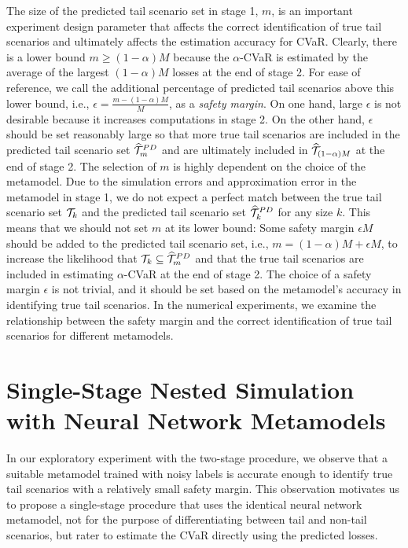 The size of the predicted tail scenario set in stage 1, $m$, is an important experiment design parameter that affects the correct identification of true tail scenarios and ultimately affects the estimation accuracy for CVaR.
Clearly, there is a lower bound $m \geq (1-\alpha)M$ because the $\alpha$-CVaR is estimated by the average of the largest $(1-\alpha)M$ losses at the end of stage 2.
For ease of reference, we call the additional percentage of predicted tail scenarios above this lower bound, i.e., $\epsilon = \frac{m - (1-\alpha)M}{M}$, as a \textit{safety margin}.
On one hand, large $\epsilon$ is not desirable because it increases computations in stage 2.
On the other hand, $\epsilon$ should be set reasonably large so that more true tail scenarios are included in the predicted tail scenario set $\widehat{\mathcal{T}}_{m}^{PD}$ and are ultimately included in $\widehat{\mathcal{T}}_{(1-\alpha )M}$ at the end of stage 2.
The selection of $m$ is highly dependent on the choice of the metamodel.
Due to the simulation errors and approximation error in the metamodel in stage 1, we do not expect a perfect match between the true tail scenario set $\mathcal{T}_{k}$ and the predicted tail scenario set $\widehat{\mathcal{T}}_{k}^{PD}$ for any size $k$.
This means that we should not set $m$ at its lower bound: Some safety margin $\epsilon M$ should be added to the predicted tail scenario set, i.e., $m = (1-\alpha )M + \epsilon M$, to increase the likelihood that $\mathcal{T}_{k} \subseteq \widehat{\mathcal{T}}_{m}^{PD}$ and that the true tail scenarios are included in estimating $\alpha$-CVaR at the end of stage 2.
The choice of a safety margin $\epsilon$ is not trivial, and it should be set based on the metamodel's accuracy in identifying true tail scenarios.
In the numerical experiments, we examine the relationship between the safety margin and the correct identification of true tail scenarios for different metamodels.

\section{Single-Stage Nested Simulation with Neural Network Metamodels} \label{sec2:metamodel1Stage}

In our exploratory experiment with the two-stage procedure, we observe that a suitable metamodel trained with noisy labels is accurate enough to identify true tail scenarios with a relatively small safety margin.
This observation motivates us to propose a single-stage procedure that uses the identical neural network metamodel, not for the purpose of differentiating between tail and non-tail scenarios, but rater to estimate the CVaR directly using the predicted losses. 

